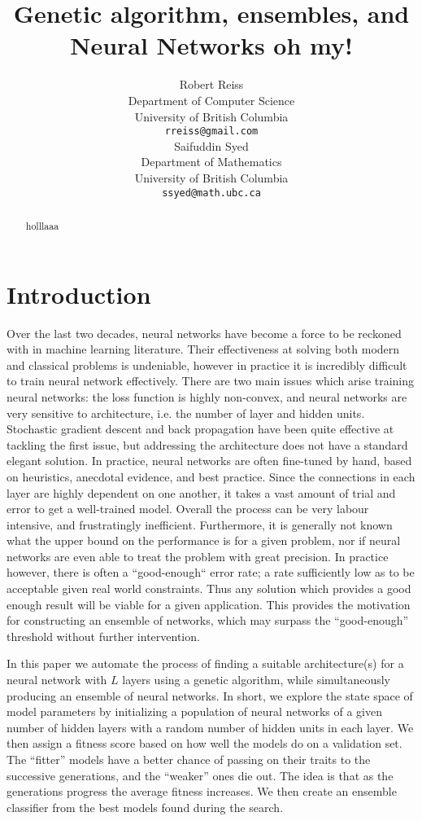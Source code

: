 \documentclass{article}
\title{Genetic algorithm, ensembles, and Neural Networks oh my!}
\author{
  Robert Reiss%
\\
  Department of Computer Science\\
  University of British Columbia\\
  \texttt{rreiss@gmail.com} \\
  \And
  Saifuddin Syed \\
  Department of Mathematics \\
  University of British Columbia\\
  \texttt{ssyed@math.ubc.ca} \\
}
\DeclareMathOperator{\1}{\mathbbm{1}}
\begin{document}

\maketitle

\begin{abstract}
holllaaa
\end{abstract}

\section{Introduction}
Over the last two decades, neural networks have become a force to be reckoned with in machine learning literature.
Their effectiveness at solving both modern and classical problems is undeniable, 
however in practice it is incredibly difficult to train neural network effectively. 
There are two main issues which arise training neural networks: the loss function is highly non-convex,
and neural networks are very sensitive to architecture, i.e. the number of layer and hidden units.
Stochastic gradient descent and back propagation have been quite effective at tackling the first issue, 
but addressing the architecture does not have a standard elegant solution. In practice, neural networks are often fine-tuned by hand,
based on heuristics, anecdotal evidence, and best practice. Since the connections in each layer are highly dependent on one another,
it takes a vast amount of trial and error to get a well-trained model. Overall the process can be very labour intensive, 
and frustratingly inefficient. Furthermore, it is generally not known what the upper bound on the performance is for a given
problem, nor if neural networks are even able to treat the problem with great precision. In practice however, there is often
a ``good-enough`` error rate; a rate sufficiently low as to be acceptable given real world constraints. Thus any solution
which provides a good enough result will be viable for a given application. This provides the motivation for constructing an 
ensemble of networks, which may surpass the ``good-enough'' threshold without further intervention.

In this paper we automate the process of finding a suitable architecture(s)
for a neural network with $L$ layers using a genetic algorithm, while simultaneously producing an ensemble of neural
networks. 
In short, we explore the state space of model parameters by initializing a population of neural networks of a given number of hidden layers
with a random number of hidden units in each layer. We then assign a fitness score based on how well the models do on a validation set. 
The ``fitter'' models have a better chance of passing on their traits to 
the successive generations, and the ``weaker'' ones die out. 
The idea is that as the generations progress the average fitness increases.
We then create an ensemble classifier from the best models found during the search. 
\end{document}

